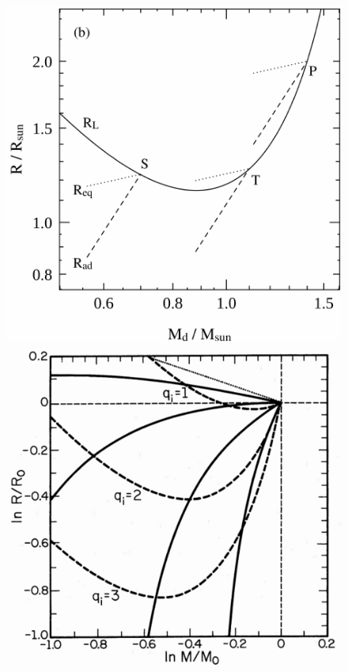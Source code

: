 \documentclass[a4paper,titlepage]{book}     	%
\begin{document}
\begin{figure}[h]
	\begin{minipage}{.49\textwidth}
		\centering
		\includegraphics[width=\textwidth]{./images/stp_roche.pdf}
	\end{minipage}
	\hfill
	\begin{minipage}{.49\textwidth}
	    \vspace{-7mm}
		\centering
		\includegraphics[width=\textwidth]{./images/core_he_rlof.pdf}	

\end{minipage}
\end{figure}
\end{document}
